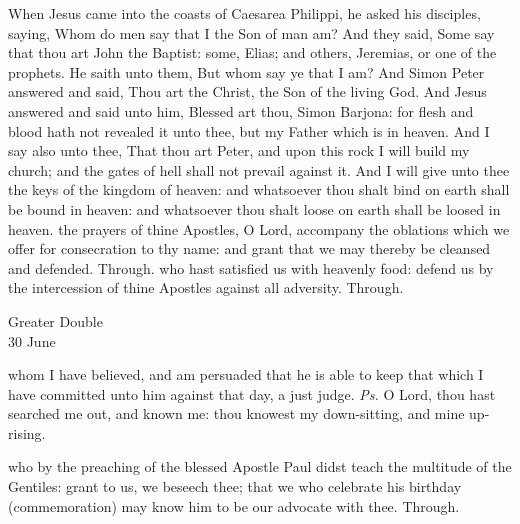  When Jesus came into the coasts of Caesarea Philippi, he asked his disciples, saying, Whom do men say that I the Son of man am? And they said, Some say that thou art John the Baptist: some, Elias; and others, Jeremias, or one of the prophets. He saith unto them, But whom say ye that I am? And Simon Peter answered and said, Thou art the Christ, the Son of the living God. And Jesus answered and said unto him, Blessed art thou, Simon Barjona: for flesh and blood hath not revealed it unto thee, but my Father which is in heaven. And I say also unto thee, That thou art Peter, and upon this rock I will build my church; and the gates of hell shall not prevail against it. And I will give unto thee the keys of the kingdom of heaven: and whatsoever thou shalt bind on earth shall be bound in heaven: and whatsoever thou shalt loose on earth shall be loosed in heaven.
\secret
{} the prayers of thine Apostles, O Lord, accompany the oblations which we offer for consecration to thy name: and grant that we may thereby be cleansed and defended. Through.
\postcommunion
{} who hast satisfied us with heavenly food: defend us by the intercession of thine Apostles against all adversity. Through.

\begin{inhead}
    {Greater Double\\
30 June}
\end{inhead}
\par\noindent
{}
\par\noindent
{}

\introit
{} whom I have believed, and am persuaded that he is able to keep that which I have committed unto him against that day, a just judge. \textit{Ps.} O Lord, thou hast searched me out, and known me: thou knowest my down-sitting, and mine up-rising.

\collect
{} who by the preaching of the blessed Apostle Paul didst teach the multitude of the Gentiles: grant to us, we beseech thee; that we who celebrate his birthday (commemoration) may know him to be our advocate with thee. Through.

